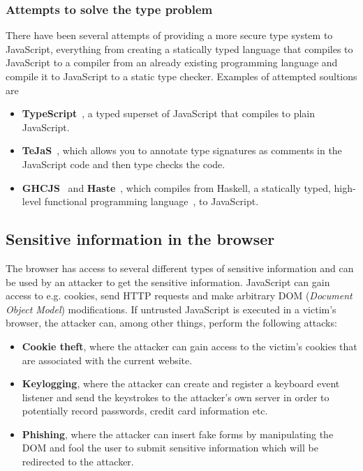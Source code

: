 \subsubsection{Attempts to solve the type problem}
There have been several attempts of providing a more secure type system to JavaScript, everything from creating a statically typed language that compiles to JavaScript to a compiler from an already existing programming language and compile it to JavaScript to a static type checker. Examples of attempted soultions are
\begin{itemize}
  \item \textbf{TypeScript}~\cite{typescript}, a typed superset of JavaScript that compiles to plain JavaScript.
  \item \textbf{TeJaS}~\cite{tejas-art,tejas-git}, which allows you to annotate type signatures as comments in the JavaScript code and then type checks the code.
  \item \textbf{GHCJS}~\cite{ghcjs} and \textbf{Haste}~\cite{haste-lang,haste-symposium}, which compiles from Haskell, a statically typed, high-level functional programming language~\cite{haskell}, to JavaScript.
\end{itemize}

\subsection{Sensitive information in the browser}
The browser has access to several different types of sensitive information and can be used by an attacker to get the sensitive information. JavaScript can gain access to e.g. cookies, send HTTP requests and make arbitrary DOM (\emph{Document Object Model}) modifications. If untrusted JavaScript is executed in a victim's browser, the attacker can, among other things, perform the following attacks:
\begin{itemize}
  \item \textbf{Cookie theft}, where the attacker can gain access to the victim's cookies that are associated with the current website.
  \item \textbf{Keylogging}, where the attacker can create and register a keyboard event listener and send the keystrokes to the attacker's own server in order to potentially record passwords, credit card information etc.
  \item \textbf{Phishing}, where the attacker can insert fake forms by manipulating the DOM and fool the user to submit sensitive information which will be redirected to the attacker.
\end{itemize}
